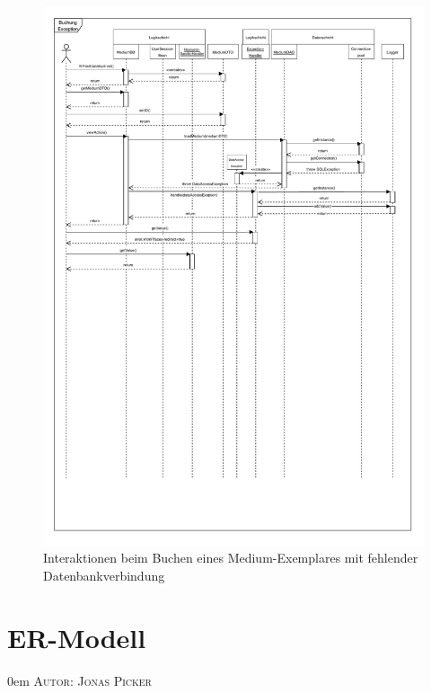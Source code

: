 \documentclass{article}
\makeatletter
\newcommand{\sectionauthor}[1]{
	{\parindent 0em \large \scshape Autor: #1 \par \nobreak \vspace*{1em}}
	\@afterheading
}
\makeatother
\begin{document}
\restoregeometry
\newpage


\begin{figure}[h]
	\hypertarget{Fehlersequenz}{}
    \centering
    \includegraphics[width = 50em]{Sequenzdiagramm-exception-v3}
    \caption{Interaktionen beim Buchen eines Medium-Exemplares mit fehlender Datenbankverbindung}
    \label{Sequenzdiagramm}
\end{figure}

\restoregeometry
\newpage

\section{ER-Modell}
\sectionauthor{Jonas Picker}
\end{document}
